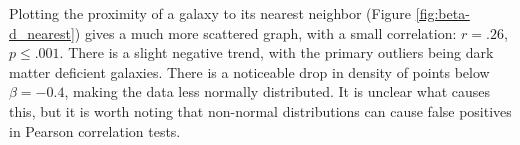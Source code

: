 Plotting the proximity of a galaxy to its nearest neighbor (Figure \ref{fig:beta-d_nearest}) gives a much more scattered graph, with a small correlation: $r = .26$, $p \leq .001$. There is a slight negative trend, with the primary outliers being dark matter deficient galaxies. There is a noticeable drop in density of points below $\beta = -0.4$, making the data less normally distributed. It is unclear what causes this, but it is worth noting that non-normal distributions can cause false positives in Pearson correlation tests.